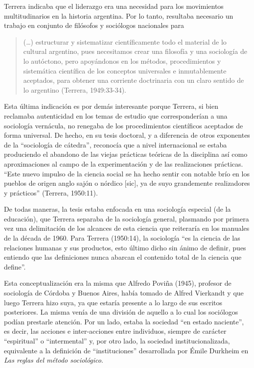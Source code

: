 Terrera indicaba que el liderazgo era una necesidad para los movimientos multitudinarios en la historia argentina. Por lo tanto, resultaba necesario un trabajo en conjunto de filósofos y sociólogos nacionales para

\begin{quote}
(\dots) estructurar y sistematizar científicamente todo el material de lo cultural argentino, pues necesitamos crear una filosofía y una sociología de lo autóctono, pero apoyándonos en los métodos, procedimientos y sistemática científica de los conceptos universales e inmutablemente aceptados, para obtener una corriente doctrinaria con un claro sentido de lo argentino (Terrera, 1949:33-34).
\end{quote}

Esta última indicación es por demás interesante porque Terrera, si bien reclamaba autenticidad en los temas de estudio que corresponderían a una sociología vernácula, no renegaba de los procedimientos científicos aceptados de forma universal. De hecho, en su tesis doctoral, y a diferencia de otros exponentes de la ``sociología de cátedra'', reconocía que a nivel internacional se estaba produciendo el abandono de las viejas prácticas teóricas de la disciplina así como aproximaciones al campo de la experimentación y de las realizaciones prácticas. ``Este nuevo impulso de la ciencia social se ha hecho sentir con notable brío en los pueblos de origen anglo sajón o nórdico [sic], ya de suyo grandemente realizadores y prácticos'' (Terrera, 1950:11).

De todas maneras, la tesis estaba enfocada en una sociología especial (de la educación), que Terrera separaba de la sociología general, plasmando por primera vez una delimitación de los alcances de esta ciencia que reiteraría en los manuales de la década de 1960. Para Terrera (1950:14), la sociología ``es la ciencia de las relaciones humanas y sus productos, esto último dicho sin ánimo de definir, pues entiendo que las definiciones nunca abarcan el contenido total de la ciencia que define''.

Esta conceptualización era la misma que Alfredo Poviña (1945), profesor de sociología de Córdoba y Buenos Aires, había tomado de Alfred Vierkandt y que luego Terrera hizo suya, ya que estaría presente a lo largo de sus escritos posteriores. La misma venía de una división de aquello a lo cual los sociólogos podían prestarle atención. Por un lado, estaba la sociedad ``en estado naciente'', es decir, las acciones e inter-acciones entre individuos, siempre de carácter ``espiritual'' o ``intermental'' y, por otro lado, la sociedad institucionalizada, equivalente a la definición de ``instituciones'' desarrollada por Émile Durkheim en \emph{Las reglas del método sociológico}.

